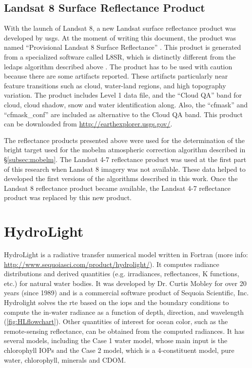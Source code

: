 \subsection{Landsat 8 Surface Reflectance Product}
\label{subsec:provisionalCDR} 
With the launch of Landsat 8, a new Landsat surface reflectance product was developed by \gls{usgs}. At the moment of writing this document, the product was named ``Provisional Landsat 8 Surface Reflectance'' \citep{L8SurfProduct2015}. This product is generated from a specialized software called L8SR, which is distinctly different from the \gls{ledaps} algorithm described above \citep{L8SurfProduct2015}. The product has to be used with caution because there are some artifacts reported. These artifacts particularly near feature transitions such as cloud, water-land regions, and high topography variation. The product includes Level 1 data file, and the ``Cloud QA'' band for cloud, cloud shadow, snow and water identification along. Also, the ``cfmask'' and ``cfmask\_conf'' are included as alternative to the Cloud QA band. This product can be downloaded from \url{http://earthexplorer.usgs.gov/}.

The reflectance products presented above were used for the determination of the bright target used for the \gls{mobelm} atmospheric correction algorithm described in \S\ref{subsec:mobelm}. The Landsat 4-7 reflectance product was used at the first part of this research when Landsat 8 imagery was not available. These data helped to developed the first versions of the algorithms described in this work. Once the Landsat 8 reflectance product became available, the Landsat 4-7 reflectance product was replaced by this new product.
\section{HydroLight}
\label{sec:hydrolight}
HydroLight is a radiative transfer numerical model written in Fortran \citep{MobleyHE} (more info: \url{http://www.sequoiasci.com/product/hydrolight/}). It computes radiance distributions and derived quantities (e.g. irradiances, reflectances, K functions, etc.) for natural water bodies. It was developed by Dr. Curtis Mobley for over 20 years (since 1989) and is a commercial software product of Sequoia Scientific, Inc. Hydrolight solves the \gls{rte} based on the \gls{iops} and the boundary conditions  to compute the in-water radiance as a function of depth, direction, and wavelength (\autoref{fig:HLflowchart}). Other quantities of interest for ocean color, such as the remote-sensing reflectance, can be obtained from the computed radiances. It has several models, including the Case 1 water model, whose main input is the chlorophyll IOPs and the Case 2 model, which is a 4-constituent model, pure water, chlorophyll, minerals and CDOM.

